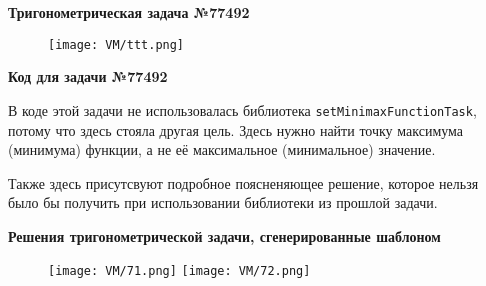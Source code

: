 \textbf{Тригонометрическая задача №77492}

	\begin{figure}[h]
		\centering
		\texttt{[image: VM/ttt.png]}
	\end{figure}


\textbf{Код для задачи №77492}




В коде этой задачи не использовалась библиотека \texttt{setMinimaxFunctionTask}, потому что здесь стояла другая цель. Здесь нужно найти точку максимума (минимума) функции, а не её максимальное (минимальное) значение. 

Также здесь присутсвуют подробное поясненяющее решение, которое нельзя было бы получить при использовании библиотеки из прошлой задачи.

\newpage

\textbf{Решения тригонометрической задачи, сгенерированные шаблоном}

	\begin{figure}[h]
		\centering
		\texttt{[image: VM/71.png]}
		\texttt{[image: VM/72.png]}
	\end{figure}
	
